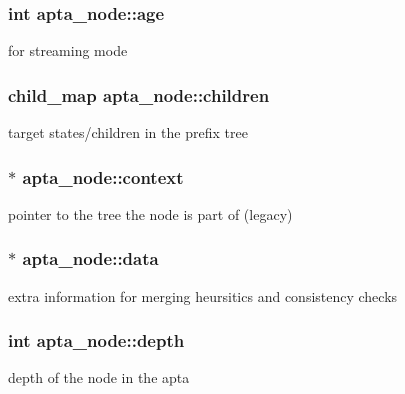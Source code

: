 \subsubsection[{\texorpdfstring{age}{age}}]{\setlength{\rightskip}{0pt plus 5cm}int apta\+\_\+node\+::age}\hypertarget{classapta__node_a24d4af165b37f04090c85df1ef3ac997}{}\label{classapta__node_a24d4af165b37f04090c85df1ef3ac997}
for streaming mode 
\subsubsection[{\texorpdfstring{children}{children}}]{\setlength{\rightskip}{0pt plus 5cm}child\+\_\+map apta\+\_\+node\+::children}\hypertarget{classapta__node_a04c0ef7f20669b97f2c5c65edc4c044c}{}\label{classapta__node_a04c0ef7f20669b97f2c5c65edc4c044c}
target states/children in the prefix tree 
\subsubsection[{\texorpdfstring{context}{context}}]{ $\ast$ apta\+\_\+node\+::context}\hypertarget{classapta__node_a95d170076f0c3f9d98f2d1701dafd2cb}{}\label{classapta__node_a95d170076f0c3f9d98f2d1701dafd2cb}
pointer to the tree the node is part of (legacy) 
\subsubsection[{\texorpdfstring{data}{data}}]{ $\ast$ apta\+\_\+node\+::data}\hypertarget{classapta__node_aaabfb6ff0a493a59541045927bc8b060}{}\label{classapta__node_aaabfb6ff0a493a59541045927bc8b060}
extra information for merging heursitics and consistency checks 
\subsubsection[{\texorpdfstring{depth}{depth}}]{\setlength{\rightskip}{0pt plus 5cm}int apta\+\_\+node\+::depth}\hypertarget{classapta__node_af55f64e7181c083d997bdf8b85cbe4d8}{}\label{classapta__node_af55f64e7181c083d997bdf8b85cbe4d8}
depth of the node in the apta 
